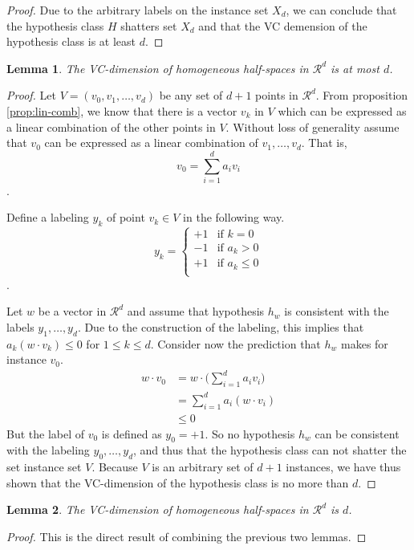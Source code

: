 \documentclass[12pt]{article}
\newtheorem{lemma}{Lemma}[section]
\begin{document}
\begin{enumerate}
\begin{proof}
    Due to the arbitrary labels on the instance set $X_d$, we can conclude that the hypothesis class $H$ shatters set $X_d$ and that the VC demension of the hypothesis class is at least $d$.
\end{proof}

\begin{lemma}
    The VC-dimension of homogeneous half-spaces in $\mathcal{R}^d$ is at most $d$.
\end{lemma}

\begin{proof}
    Let $V=(v_0, v_1, \dots, v_d)$ be any set of $d+1$ points in $\mathcal{R}^d$.
    From proposition \ref{prop:lin-comb}, we know that there is a vector $v_k$ in $V$ which can be expressed as a linear combination of the other points in $V$.
    Without loss of generality assume that $v_0$ can be expressed as a linear combination of $v_1, \dots, v_d$.
    That is,
    \[
    v_0 = \sum_{i=1}^{d} a_i v_i
    \].

    Define a labeling $y_k$ of point $v_k \in V$ in the following way.
    \[
    y_k = \begin{cases}
        +1  &  \text{if } k = 0   \\
        -1  &  \text{if } a_k > 0 \\
        +1  &  \text{if } a_k \leq 0 \\
    \end{cases}
    \].

    Let $w$ be a vector in $\mathcal{R}^d$ and assume that hypothesis $h_w$ is consistent with the labels $y_1, \dots, y_d$.
    Due to the construction of the labeling, this implies that $a_k (w \cdot v_k) \leq 0$ for $1 \leq k \leq d$.
    Consider now the prediction that $h_w$ makes for instance $v_0$.
    \begin{align*}
        w \cdot v_0 &= w \cdot \bigg( \sum_{i=1}^{d} a_i v_i \bigg) \\
            &= \sum_{i=1}^{d} a_i (w \cdot v_i) \\
            &\leq 0
    \end{align*}
    But the label of $v_0$ is defined as $y_0 = +1$.
    So no hypothesis $h_w$ can be consistent with the labeling $y_0, \dots, y_d$, and thus that the hypothesis class can not shatter the set instance set $V$.
    Because $V$ is an arbitrary set of $d+1$ instances, we have thus shown that the VC-dimension of the hypothesis class is no more than $d$.
\end{proof}

\begin{lemma}
    The VC-dimension of homogeneous half-spaces in $\mathcal{R}^d$ is $d$.
\end{lemma}
\begin{proof}
    This is the direct result of combining the previous two lemmas.
\end{proof}


\end{enumerate}
\end{document}
